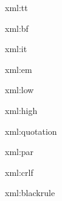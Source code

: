 
\startxmlsetups xml:tt
	{\tt {}}
\stopxmlsetups

\startxmlsetups xml:bf
	{\bf {}}
\stopxmlsetups

\startxmlsetups xml:it
	{\it {}}
\stopxmlsetups

\startxmlsetups xml:em
	{\em {}}
\stopxmlsetups

\startxmlsetups xml:low
\stopxmlsetups

\startxmlsetups xml:high
\stopxmlsetups

\startxmlsetups xml:quotation
\stopxmlsetups

\startxmlsetups xml:par
	\par
\stopxmlsetups

\startxmlsetups xml:crlf
	\crlf
\stopxmlsetups

\startxmlsetups xml:blackrule
	\blackrule
\stopxmlsetups

